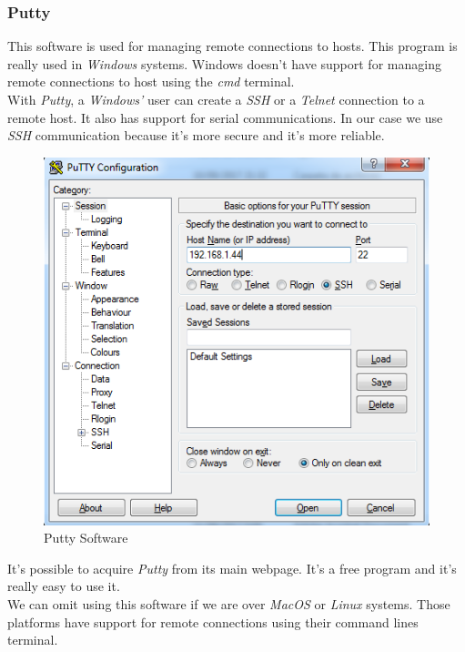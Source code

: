 \subsubsection{Putty}

This software is used for managing remote connections to hosts. This program is really used in \textit{Windows} systems. Windows doesn't have support for managing remote connections to host using the \textit{cmd} terminal.\\

With \textit{Putty}, a \textit{Windows'} user can create a \textit{SSH} or a \textit{Telnet} connection to a remote host. It also has support for serial communications. In our case we use \textit{SSH} communication because it's more secure and it's more reliable.\\

\begin{figure}[H]
\begin{centering}
\includegraphics[scale=0.7]{IMGS/PUTTY.PNG}
\caption{Putty Software \label{PYCHARM}}
\end{centering}
\end{figure}

It's possible to acquire \textit{Putty} from its main webpage. It's a free program and it's really easy to use it.\\

We can omit using this software if we are over \textit{MacOS} or \textit{Linux} systems. Those platforms have support for remote connections using their command lines terminal.

\newpage

